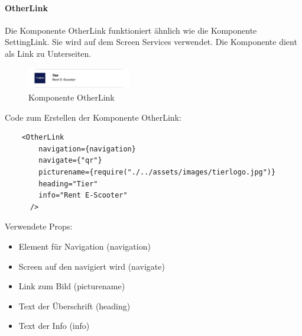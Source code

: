 \paragraph{OtherLink}Die Komponente OtherLink funktioniert ähnlich wie die Komponente SettingLink. Sie wird auf dem Screen Services verwendet. Die Komponente dient als Link zu Unterseiten.\\
\begin{figure}[H]
    \centering
    \includegraphics[width=0.4\textwidth]{images/app-screenshots/otherlink.png}
    \caption{Komponente OtherLink}
    \label{fig:otherlink}
\end{figure}
Code zum Erstellen der Komponente OtherLink:\\
\begin{verbatim}
    <OtherLink
        navigation={navigation}
        navigate={"qr"}
        picturename={require("./../assets/images/tierlogo.jpg")}
        heading="Tier"
        info="Rent E-Scooter"
      />
\end{verbatim}
Verwendete Props:
\begin{itemize}
    \item Element für Navigation (navigation)
    \item Screen auf den navigiert wird (navigate)
    \item Link zum Bild (picturename)
    \item Text der Überschrift (heading)
    \item Text der Info (info)
\end{itemize}


